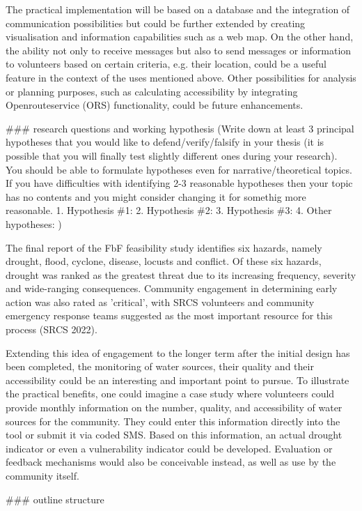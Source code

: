 The practical implementation will be based on a database and the integration of communication possibilities but could be further extended by creating visualisation and information capabilities such as a web map. On the other hand, the ability not only to receive messages but also to send messages or information to volunteers based on certain criteria, e.g. their location, could be a useful feature in the context of the uses mentioned above. Other possibilities for analysis or planning purposes, such as calculating accessibility by integrating Openrouteservice (ORS) functionality, could be future enhancements.

\#\#\# research questions and working hypothesis
(Write down at least 3 principal hypotheses that you would like to defend/verify/falsify in your thesis (it is possible that you will finally test slightly different ones during your research). You should be able to formulate hypotheses even for narrative/theoretical topics. If you have difficulties with identifying 2-3 reasonable hypotheses then your topic has no contents and you might consider changing it for somethig more reasonable.
1.	Hypothesis \#1:
2.	Hypothesis \#2:
3.	Hypothesis \#3:
4.	Other hypotheses:
)


The final report of the FbF feasibility study identifies six hazards, namely drought, flood, cyclone, disease, locusts and conflict. Of these six hazards, drought was ranked as the greatest threat due to its increasing frequency, severity and wide-ranging consequences. Community engagement in determining early action was also rated as 'critical', with SRCS volunteers and community emergency response teams suggested as the most important resource for this process (SRCS 2022).

Extending this idea of engagement to the longer term after the initial design has been completed, the monitoring of water sources, their quality and their accessibility could be an interesting and important point to pursue. To illustrate the practical benefits, one could imagine a case study where volunteers could provide monthly information on the number, quality, and accessibility of water sources for the community. They could enter this information directly into the tool or submit it via coded SMS. Based on this information, an actual drought indicator or even a vulnerability indicator could be developed. Evaluation or feedback mechanisms would also be conceivable instead, as well as use by the community itself.

\#\#\# outline structure


